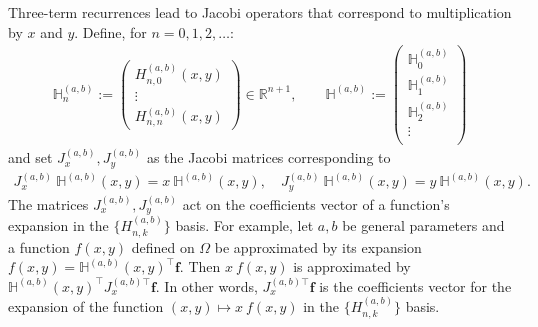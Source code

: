 \documentclass[11pt, oneside]{article}   	%
\newcommand{\R}{\mathbb{R}}
\newcommand{\hdop}{H}
\newcommand{\bighdop}{\mathbb{\hdop}}
\newcommand{\hdopab}{\hdop^{(a,b)}}
\newcommand{\hdopnkab}{\hdop_{n,k}^{(a,b)}}
\newcommand{\bighdopab}{\bighdop^{(a,b)}}
\begin{document}
Three-term recurrences lead to Jacobi operators that correspond to multiplication by $x$ and $y$. Define, for $n=0,1,2,\dots$: 
\begin{align*}
\bighdopab_n := \begin{pmatrix}
		\hdopab_{n,0}(x,y) \\
		\vdots \\
		\hdopab_{n,n}(x,y)
	\end{pmatrix} \in \R^{n+1}, 
\quad \quad 
\bighdopab := \begin{pmatrix}
		\bighdopab_0 \\
		\bighdopab_1 \\
		\bighdopab_2 \\
		\vdots \\
	\end{pmatrix}
\end{align*}
and set $J_x^{(a,b)}, J_y^{(a,b)}$ as the Jacobi matrices corresponding to
\begin{align}
J_x^{(a,b)} \: \bighdopab(x,y) = x \: \bighdopab(x,y), \quad J_y^{(a,b)} \: \bighdopab(x,y) = y \: \bighdopab(x,y).
\label{eqn:jacobimatricesdefinition}
\end{align}
The matrices $J_x^{(a,b)}, J_y^{(a,b)}$ act on the coefficients vector of a function's expansion in the $\{\hdopnkab\}$ basis. For example, let $a, b$ be general parameters and a function $f(x,y)$ defined on $\Omega$ be approximated by its expansion $f(x,y) = \bighdopab(x,y)^\top \mathbf{f}$. Then $x \: f(x,y)$ is approximated by $\bighdopab(x,y)^\top {J_x^{(a,b)\top}} \mathbf{f}$. In other words, ${J_x^{(a,b)\top}} \mathbf{f}$ is the coefficients vector for the expansion of the function $(x,y) \mapsto x \: f(x,y)$ in the  $\{\hdopnkab\}$ basis.
\end{document}

